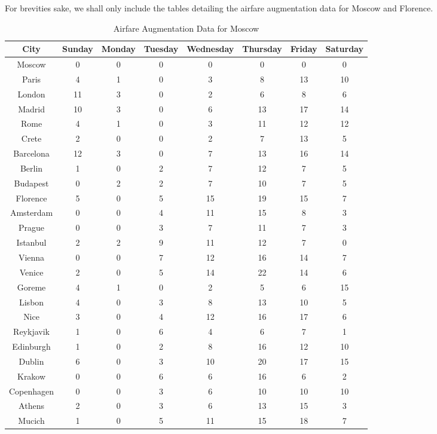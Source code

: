 \documentclass[12pt]{article}
\begin{document}
For brevities sake, we shall only include the tables detailing the airfare augmentation data for Moscow and Florence.

\begin{table}[h]
\caption{Airfare Augmentation Data for Moscow}
\centering
\vspace{1mm}
\begin{tabular}{c|c|c|c|c|c|c|c}
\hline
\rule{0pt}{2ex} City & Sunday & Monday & Tuesday & Wednesday & Thursday & Friday & Saturday \\
\hline
\rule{0pt}{2ex}Moscow & 0 & 0 & 0 & 0 & 0 & 0 & 0 \\
Paris & 4 & 1 & 0 & 3 & 8 & 13 & 10 \\
London & 11 & 3 & 0 & 2 & 6 & 8 & 6 \\
Madrid & 10 & 3 & 0 & 6 & 13 & 17 & 14 \\
Rome & 4 & 1 & 0 & 3 & 11 & 12 & 12 \\
Crete & 2 & 0 & 0 & 2 & 7 & 13 & 5 \\
Barcelona & 12 & 3 & 0 & 7 & 13 & 16 & 14 \\
Berlin & 1 & 0 & 2 & 7 & 12 & 7 & 5 \\
Budapest & 0 & 2 & 2 & 7 & 10 & 7 & 5 \\
Florence & 5 & 0 & 5 & 15 & 19 & 15 & 7 \\
Amsterdam & 0 & 0 & 4 & 11 & 15 & 8 & 3 \\
Prague & 0 & 0 & 3 & 7 & 11 & 7 & 3 \\
Istanbul & 2 & 2 & 9 & 11 & 12 & 7 & 0 \\
Vienna & 0 & 0 & 7 & 12 & 16 & 14 & 7 \\
Venice & 2 & 0 & 5 & 14 & 22 & 14 & 6 \\
Goreme & 4 & 1 & 0 & 2 & 5 & 6 & 15 \\
Lisbon & 4 & 0 & 3 & 8 & 13 & 10 & 5 \\
Nice & 3 & 0 & 4 & 12 & 16 & 17 & 6 \\
Reykjavik & 1 & 0 & 6 & 4 & 6 & 7 & 1 \\
Edinburgh & 1 & 0 & 2 & 8 & 16 & 12 & 10 \\
Dublin & 6 & 0 & 3 & 10 & 20 & 17 & 15 \\
Krakow & 0 & 0 & 6 & 6 & 16 & 6 & 2 \\
Copenhagen & 0 & 0 & 3 & 6 & 10 & 10 & 10 \\
Athens & 2 & 0 & 3 & 6 & 13 & 15 & 3 \\
Mucich & 1 & 0 & 5 & 11 & 15 & 18 & 7 \\
\end{tabular}
\end{table}
\end{document}
